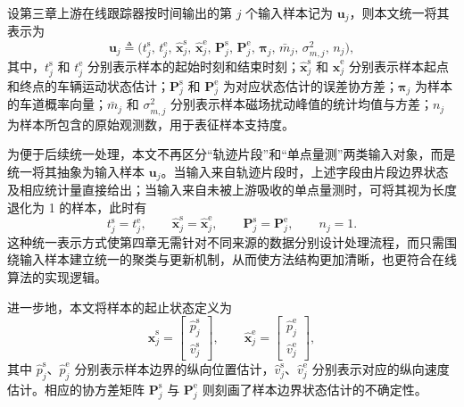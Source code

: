 \documentclass{xdupgthesis}
\begin{document}
设第三章上游在线跟踪器按时间输出的第 $j$ 个输入样本记为 $\mathbf{u}_j$，则本文统一将其表示为
\begin{equation}
	\mathbf{u}_j \triangleq
	\Big(
	t_j^{\mathrm{s}},\, t_j^{\mathrm{e}},\,
	\hat{\mathbf{x}}_j^{\mathrm{s}},\, \hat{\mathbf{x}}_j^{\mathrm{e}},\,
	\mathbf{P}_j^{\mathrm{s}},\, \mathbf{P}_j^{\mathrm{e}},\,
	\boldsymbol{\pi}_j,\,
	\bar m_j,\, \sigma_{m,j}^{2},\,
	n_j
	\Big),
\end{equation}
其中，$t_j^{\mathrm{s}}$ 和 $t_j^{\mathrm{e}}$ 分别表示样本的起始时刻和结束时刻；$\hat{\mathbf{x}}_j^{\mathrm{s}}$ 和 $\hat{\mathbf{x}}_j^{\mathrm{e}}$ 分别表示样本起点和终点的车辆运动状态估计；$\mathbf{P}_j^{\mathrm{s}}$ 和 $\mathbf{P}_j^{\mathrm{e}}$ 为对应状态估计的误差协方差；$\boldsymbol{\pi}_j$ 为样本的车道概率向量；$\bar m_j$ 和 $\sigma_{m,j}^{2}$ 分别表示样本磁场扰动峰值的统计均值与方差；$n_j$ 为样本所包含的原始观测数，用于表征样本支持度。

为便于后续统一处理，本文不再区分“轨迹片段”和“单点量测”两类输入对象，而是统一将其抽象为输入样本 $\mathbf{u}_j$。当输入来自轨迹片段时，上述字段由片段边界状态及相应统计量直接给出；当输入来自未被上游吸收的单点量测时，可将其视为长度退化为 1 的样本，此时有
\begin{equation}
	t_j^{\mathrm{s}} = t_j^{\mathrm{e}}, \qquad
	\hat{\mathbf{x}}_j^{\mathrm{s}} = \hat{\mathbf{x}}_j^{\mathrm{e}}, \qquad
	\mathbf{P}_j^{\mathrm{s}} = \mathbf{P}_j^{\mathrm{e}}, \qquad
	n_j = 1.
\end{equation}
这种统一表示方式使第四章无需针对不同来源的数据分别设计处理流程，而只需围绕输入样本建立统一的聚类与更新机制，从而使方法结构更加清晰，也更符合在线算法的实现逻辑。

进一步地，本文将样本的起止状态定义为
\begin{equation}
	\hat{\mathbf{x}}_j^{\mathrm{s}}=
	\begin{bmatrix}
		\hat p_j^{\mathrm{s}}\\[2pt]
		\hat v_j^{\mathrm{s}}
	\end{bmatrix},
	\qquad
	\hat{\mathbf{x}}_j^{\mathrm{e}}=
	\begin{bmatrix}
		\hat p_j^{\mathrm{e}}\\[2pt]
		\hat v_j^{\mathrm{e}}
	\end{bmatrix},
\end{equation}
其中 $\hat p_j^{\mathrm{s}}$、$\hat p_j^{\mathrm{e}}$ 分别表示样本边界的纵向位置估计，$\hat v_j^{\mathrm{s}}$、$\hat v_j^{\mathrm{e}}$ 分别表示对应的纵向速度估计。相应的协方差矩阵 $\mathbf{P}_j^{\mathrm{s}}$ 与 $\mathbf{P}_j^{\mathrm{e}}$ 则刻画了样本边界状态估计的不确定性。
\end{document}
